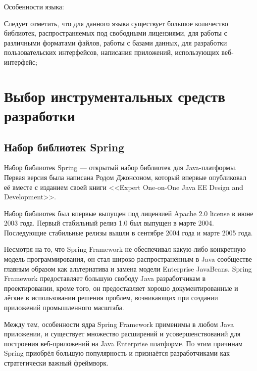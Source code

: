 \documentclass[14pt,a4paper]{reportmod}
\begin{document}
Особенности языка:
\begin{gostitemize}
\end{gostitemize}


Следует отметить, что для данного языка существует большое количество библиотек, распространяемых под свободными лицензиями, для работы с различными форматами файлов, работы с базами данных, для разработки пользовательских интерфейсов, написания приложений, использующих веб-интерфейс;

\section{Выбор инструментальных средств разработки}

\subsection{Набор библиотек Spring}
Набор библиотек Spring --- открытый набор библиотек для Java-платформы. Первая версия была написана Родом Джонсоном, который впервые опубликовал её вместе с изданием своей книги <<Expert One-on-One Java EE Design and Development>>.


Набор библиотек был впервые выпущен под лицензией Apache 2.0 license в июне 2003 года. Первый стабильный релиз 1.0 был выпущен в марте 2004. Последующие стабильные релизы вышли в сентябре 2004 года и марте 2005 года.


Несмотря на то, что Spring Framework не обеспечивал какую-либо конкретную модель программирования, он стал широко распространённым в Java сообществе главным образом как альтернатива и замена модели Enterprise JavaBeans. Spring Framework предоставляет большую свободу Java разработчикам в проектировании, кроме того, он предоставляет хорошо документированные и лёгкие в использовании решения проблем, возникающих при создании приложений промышленного масштаба.


Между тем, особенности ядра Spring Framework применимы в любом Java приложении, и существует множество расширений и усовершенствований для построения веб-приложений на Java Enterprise платформе. По этим причинам Spring приобрёл большую популярность и признаётся разработчиками как стратегически важный фреймворк\cite{refspringsource}.
\end{document}
